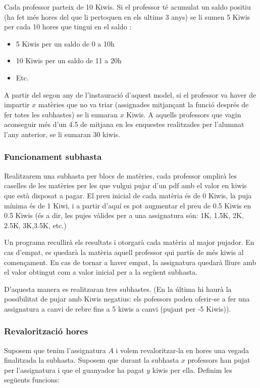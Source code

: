 \documentclass[10pt,twocolumn]{article}
\begin{document}
Cada professor parteix de 10 Kiwis.
Si el professor té acumulat un saldo positiu (ha fet més hores del que li pertoquen en els ultims 3 anys) se li sumen 5 Kiwis per cada 10 hores que tingui en el saldo : 
\begin{itemize}
	\item 5 Kiwis per un saldo de 0 a 10h
	\item 10 Kiwis per un saldo de 11 a 20h
	\item  Etc.
\end{itemize}
A partir del segon any de l'instauració d'aquest model, si el professor va haver de impartir $x$ matèries que no va triar (assignades mitjançant la funció després de fer totes les subhastes) se li sumaran $x$ Kiwis. A aquells professors que vagin aconseguir més d'un 4.5 de mitjana en les enquestes realitzades per l'alumnat l'any anterior,  se li sumaran 30 kiwis. 

\subsubsection{Funcionament subhasta}
Realitzarem una subhasta per blocs de matèries, cada professor omplirà les caselles de les matèries per les que vulgui pujar d'un pdf amb el valor en kiwis que està disposat  a pagar. El preu inicial de cada matèria és de 0 Kiwis, la puja mínima és de 1 Kiwi, i a partir d'aquí es pot augmentar el preu de 0.5 Kiwis en 0.5 Kiwis (és a dir, les pujes vàlides per a una assignatura són: 1K, 1.5K, 2K, 2.5K, 3K,3.5K, etc.)

Un programa recullirà els resultats i otorgarà cada matèria al major pujador. En cas d'empat, es quedarà la matèria aquell professor qui partís de més kiwis al començament. En cas de tornar a haver empat, la assignatura quedarà lliure amb el valor obtingut com a valor inicial per a la següent subhasta.

D'aquesta manera es realitzaran tres subhastes. (En la última hi haurà la possibilitat de pujar amb Kiwis negatius: els pofessors poden oferir-se a fer una assignatura a canvi de rebre fins a 5 kiwis a canvi (pujant per -5 Kiwis)).

\subsubsection{Revalorització hores}

Suposem que tenim l'assignatura $A$ i volem revaloritzar-la en hores una vegada finalitzada la subhasta.
Suposem que durant la subhasta $x$ professors han pujat per l'assignatura i que el guanyador ha pagat $y$ kiwis per ella. Definim les següents funcions:
\end{document}
